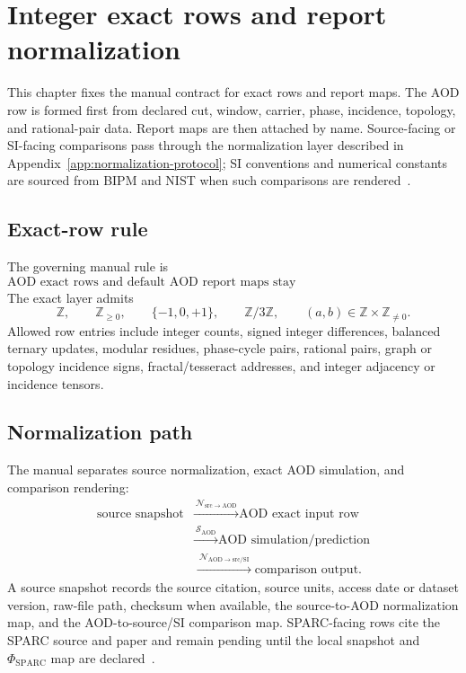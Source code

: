 \section{Integer exact rows and report normalization}
\label{man:integer-exact-rows-report-normalization}

This chapter fixes the manual contract for exact rows and report maps. The AOD row is formed first from declared cut, window, carrier, phase, incidence, topology, and rational-pair data. Report maps are then attached by name. Source-facing or SI-facing comparisons pass through the normalization layer described in Appendix~\ref{app:normalization-protocol}; SI conventions and numerical constants are sourced from BIPM and NIST when such comparisons are rendered~\cite{bipm_si_brochure_2025,nist_codata_2022,nist_constants_complete}.

\subsection{Exact-row rule}
\label{man:exact-row-rule}

The governing manual rule is
\[
\boxed{\text{AOD exact rows and default AOD report maps stay integer/rational/cycle/topology based.}}
\]
The exact layer admits
\[
\mathbb Z,\qquad
\mathbb Z_{\ge 0},\qquad
\{-1,0,+1\},\qquad
\mathbb Z/3\mathbb Z,\qquad
(a,b)\in\mathbb Z\times\mathbb Z_{\ne0}.
\]
Allowed row entries include integer counts, signed integer differences, balanced ternary updates, modular residues, phase-cycle pairs, rational pairs, graph or topology incidence signs, fractal/tesseract addresses, and integer adjacency or incidence tensors.

\subsection{Normalization path}
\label{man:integer-normalization-path}

The manual separates source normalization, exact AOD simulation, and comparison rendering:
\[
\begin{aligned}
\text{source snapshot}
&\xrightarrow{\ \mathcal N_{\mathrm{src}\to\mathrm{AOD}}\ }
\text{AOD exact input row}\\
&\xrightarrow{\ \mathcal S_{\mathrm{AOD}}\ }
\text{AOD simulation/prediction}\\
&\xrightarrow{\ \mathcal N_{\mathrm{AOD}\to\mathrm{src/SI}}\ }
\text{comparison output}.
\end{aligned}
\]
A source snapshot records the source citation, source units, access date or dataset version, raw-file path, checksum when available, the source-to-AOD normalization map, and the AOD-to-source/SI comparison map. SPARC-facing rows cite the SPARC source and paper and remain pending until the local snapshot and \(\Phi_{\mathrm{SPARC}}\) map are declared~\cite{sparc_paper,sparc_site}.

